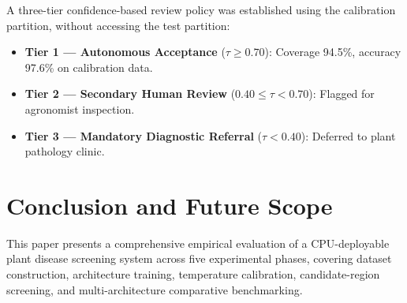 \documentclass[pdflatex,sn-mathphys-num]{sn-jnl}
\begin{document}
A three-tier confidence-based review policy was established using the calibration
partition, without accessing the test partition:
\begin{itemize}
  \item \textbf{Tier 1 --- Autonomous Acceptance} ($\tau \geq 0.70$): Coverage 94.5\%,
        accuracy 97.6\% on calibration data.
  \item \textbf{Tier 2 --- Secondary Human Review} ($0.40 \leq \tau < 0.70$):
        Flagged for agronomist inspection.
  \item \textbf{Tier 3 --- Mandatory Diagnostic Referral} ($\tau < 0.40$):
        Deferred to plant pathology clinic.
\end{itemize}


\section{Conclusion and Future Scope}
\label{sec:conclusion}

This paper presents a comprehensive empirical evaluation of a CPU-deployable plant
disease screening system across five experimental phases, covering dataset construction,
architecture training, temperature calibration, candidate-region screening, and
multi-architecture comparative benchmarking.
\end{document}
